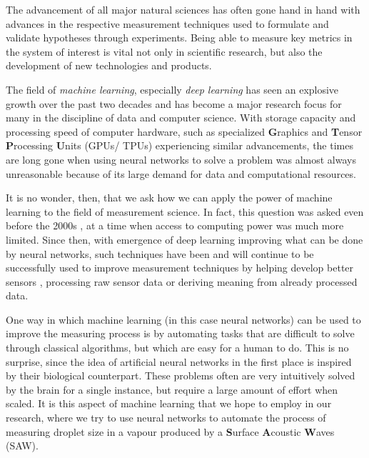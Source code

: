 The advancement of all major natural sciences has often gone hand in hand with advances in the respective measurement techniques used to formulate and validate hypotheses through experiments. 
Being able to measure key metrics in the system of interest is vital not only in scientific research, but also the development of new technologies and products. 

The field of \emph{machine learning}, especially \emph{deep learning} has seen an explosive growth over the past two decades and has become a major research focus for many in the discipline of data and computer science. 
With storage capacity and processing speed of computer hardware, such as specialized \textbf{G}raphics and \textbf{T}ensor \textbf{P}rocessing \textbf{U}nits (GPUs/ TPUs) experiencing similar advancements, the times are long gone when using neural networks to solve a problem was almost always unreasonable because of its large demand for data and computational resources. 

It is no wonder, then, that we ask how we can apply the power of machine learning to the field of measurement science. In fact, this question was asked even before the 2000s \cite{alippiArtificialIntelligenceInstruments1998}, at a time when access to computing power was much more limited. Since then, with emergence of deep learning improving what can be done by neural networks, such techniques have been and will continue to be successfully used to improve measurement techniques by helping develop better sensors \cite{ballardMachineLearningComputationenabled2021}, processing raw sensor data or deriving meaning from already processed data. 

One way in which machine learning (in this case neural networks) can be used to improve the measuring process is by automating tasks that are difficult to solve through classical algorithms, but which are easy for a human to do. This is no surprise, since the idea of artificial neural networks in the first place is inspired by their biological counterpart. These problems often are very intuitively solved by the brain for a single instance, but require a large amount of effort when scaled. 
It is this aspect of machine learning that we hope to employ in our research, where we try to use neural networks to automate the process of measuring droplet size in a vapour produced by a \textbf{S}urface \textbf{A}coustic \textbf{W}aves (SAW). 

